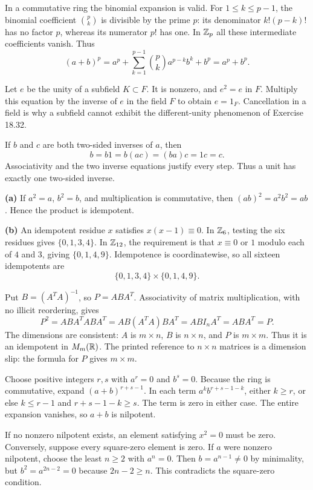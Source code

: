 In a commutative ring the binomial expansion is valid. For $1\le k\le p-1$, the binomial coefficient $\binom pk$ is divisible by the prime $p$: its denominator $k!(p-k)!$ has no factor $p$, whereas its numerator $p!$ has one. In $\mathbb{Z}_p$ all these intermediate coefficients vanish. Thus
\[(a+b)^p=a^p+\sum_{k=1}^{p-1}\binom pk a^{p-k}b^k+b^p=a^p+b^p.
\]

Let $e$ be the unity of a subfield $K\subset F$. It is nonzero, and $e^2=e$ in $F$. Multiply this equation by the inverse of $e$ in the field $F$ to obtain $e=1_F$. Cancellation in a field is why a subfield cannot exhibit the different-unity phenomenon of Exercise 18.32.

If $b$ and $c$ are both two-sided inverses of $a$, then
\[b=b1=b(ac)=(ba)c=1c=c.
\]
Associativity and the two inverse equations justify every step. Thus a unit has exactly one two-sided inverse.

\textbf{(a)} If $a^2=a$, $b^2=b$, and multiplication is commutative, then $(ab)^2=a^2b^2=ab$. Hence the product is idempotent.\par
\textbf{(b)} An idempotent residue $x$ satisfies $x(x-1)\equiv0$. In $\mathbb{Z}_6$, testing the six residues gives $\{0,1,3,4\}$. In $\mathbb{Z}_{12}$, the requirement is that $x\equiv0$ or $1$ modulo each of $4$ and $3$, giving $\{0,1,4,9\}$. Idempotence is coordinatewise, so all sixteen idempotents are
\[\boxed{\{0,1,3,4\}\times\{0,1,4,9\}}.
\]

Put $B=(A^TA)^{-1}$, so $P=ABA^T$. Associativity of matrix multiplication, with no illicit reordering, gives
\[P^2=ABA^TABA^T=AB(A^TA)BA^T=AB I_n A^T=ABA^T=P.
\]
The dimensions are consistent: $A$ is $m\times n$, $B$ is $n\times n$, and $P$ is $m\times m$. Thus it is an idempotent in $M_m(\mathbb{R})$. The printed reference to $n\times n$ matrices is a dimension slip: the formula for $P$ gives $m\times m$.

Choose positive integers $r,s$ with $a^r=0$ and $b^s=0$. Because the ring is commutative, expand $(a+b)^{r+s-1}$. In each term $a^k b^{r+s-1-k}$, either $k\ge r$, or else $k\le r-1$ and $r+s-1-k\ge s$. The term is zero in either case. The entire expansion vanishes, so $a+b$ is nilpotent.

If no nonzero nilpotent exists, an element satisfying $x^2=0$ must be zero. Conversely, suppose every square-zero element is zero. If $a$ were nonzero nilpotent, choose the least $n\ge2$ with $a^n=0$. Then $b=a^{n-1}\ne0$ by minimality, but $b^2=a^{2n-2}=0$ because $2n-2\ge n$. This contradicts the square-zero condition.

